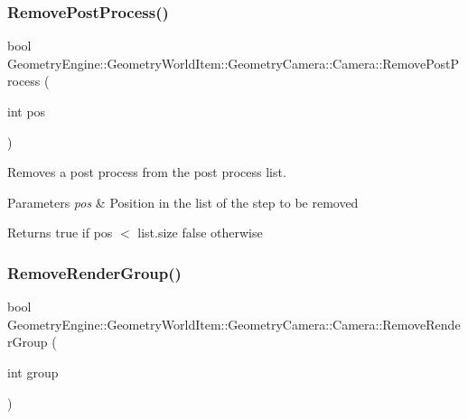 \subsubsection{\texorpdfstring{RemovePostProcess()}{RemovePostProcess()}}
{\footnotesize\ttfamily bool Geometry\+Engine\+::\+Geometry\+World\+Item\+::\+Geometry\+Camera\+::\+Camera\+::\+Remove\+Post\+Process (\begin{DoxyParamCaption}\item[{int}]{pos }\end{DoxyParamCaption})\hspace{0.3cm}{\ttfamily [virtual]}}

Removes a post process from the post process list. 
\begin{DoxyParams}{Parameters}
{\em pos} & Position in the list of the step to be removed \\
\hline
\end{DoxyParams}
\begin{DoxyReturn}{Returns}
true if pos $<$ list.\+size false otherwise 
\end{DoxyReturn}
\mbox{\label{class_geometry_engine_1_1_geometry_world_item_1_1_geometry_camera_1_1_camera_aea364f3b5f2aecabcb240825988d6bee}} 
\subsubsection{\texorpdfstring{RemoveRenderGroup()}{RemoveRenderGroup()}}
{\footnotesize\ttfamily bool Geometry\+Engine\+::\+Geometry\+World\+Item\+::\+Geometry\+Camera\+::\+Camera\+::\+Remove\+Render\+Group (\begin{DoxyParamCaption}\item[{int}]{group }\end{DoxyParamCaption})\hspace{0.3cm}{\ttfamily [virtual]}}

